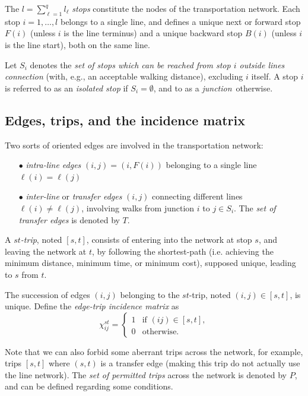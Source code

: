 \documentclass{bmcart}
\begin{document}
The $l=\sum_{\ell=1}^ql_\ell$ \emph{stops} constitute the nodes of the transportation network. Each stop $i=1,\ldots,l$ belongs to a single line, and defines a unique next or forward stop $F(i)$ (unless $i$ is the line terminus) and a unique backward stop $B(i)$ (unless $i$ is the line start), both on the same line.  

Let $S_i$ denotes the \emph{set of stops which can be reached from stop $i$ outside lines connection} (with, e.g., an acceptable walking distance), excluding $i$ itself. A stop $i$ is referred to as an \emph{isolated stop} if $S_i=\emptyset$, and to as a \emph{junction} otherwise. 

\subsection{Edges, trips, and the incidence matrix}
\label{Line edges, transfer edges and trips}

Two sorts of oriented edges are involved in the transportation network: 
\begin{enumerate}
  \item[$\bullet$] \emph{intra-line edges} $(i,j)=(i,F(i))$ belonging to a single line  $\ell(i)=\ell(j)$
  \item[$\bullet$] \emph{inter-line} or \emph{transfer edges} $(i,j)$ connecting different lines $\ell(i)\neq \ell(j)$, involving walks from junction $i$ to $j\in S_i$. The \emph{set of transfer edges} is denoted by $T$.
\end{enumerate}

A \emph{$st$-trip}, noted $[s,t]$, consists of entering into the network at stop $s$, and leaving the network at $t$, by following the shortest-path (i.e. achieving the minimum distance,  minimum time, or  minimum cost), supposed unique, leading to $s$ from $t$.

The succession of edges $(i, j)$ belonging to the $st$-trip, noted $(i,j)\in [s,t]$, is unique. Define the \emph{edge-trip incidence matrix} as
\begin{equation}
\label{edgetrip}
\chi_{ij}^{st} = \begin{cases}
  1    & \text{if $(ij)\in [s,t]$}, \\
  0    & \text{otherwise}.
\end{cases}
\end{equation}

Note that we can also forbid some aberrant trips across the network, for example, trips $[s, t]$ where $(s, t)$ is a transfer edge (making this trip do not actually use the line network). The \emph{set of permitted trips} across the network is denoted by $P$, and can be defined regarding some conditions.
\end{document}
